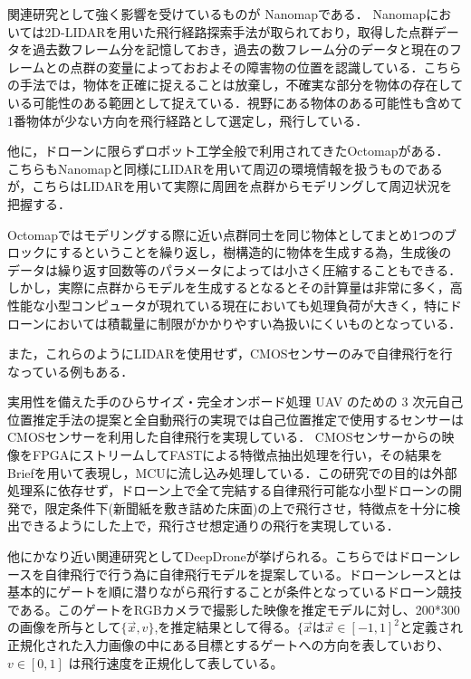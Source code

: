 \documentclass[a4j,10pt]{jsarticle}
\begin{document}
関連研究として強く影響を受けているものが Nanomap\cite{Nanomap}である．
Nanomapにおいては2D-LIDARを用いた飛行経路探索手法が取られており，取得した点群データを過去数フレーム分を記憶しておき，過去の数フレーム分のデータと現在のフレームとの点群の変量によっておおよその障害物の位置を認識している．こちらの手法では，物体を正確に捉えることは放棄し，不確実な部分を物体の存在している可能性のある範囲として捉えている．視野にある物体のある可能性も含めて1番物体が少ない方向を飛行経路として選定し，飛行している．

他に，ドローンに限らずロボット工学全般で利用されてきたOctomap\cite{Octomap}がある．
こちらもNanomapと同様にLIDARを用いて周辺の環境情報を扱うものであるが，こちらはLIDARを用いて実際に周囲を点群からモデリングして周辺状況を把握する．

Octomapではモデリングする際に近い点群同士を同じ物体としてまとめ1つのブロックにするということを繰り返し，樹構造的に物体を生成する為，生成後のデータは繰り返す回数等のパラメータによっては小さく圧縮することもできる．
しかし，実際に点群からモデルを生成するとなるとその計算量は非常に多く，高性能な小型コンピュータが現れている現在においても処理負荷が大きく，特にドローンにおいては積載量に制限がかかりやすい為扱いにくいものとなっている．

また，これらのようにLIDARを使用せず，CMOSセンサーのみで自律飛行を行なっている例もある．

実用性を備えた手のひらサイズ・完全オンボード処理 UAV のための 3 次元自己位置推定手法の提案と全自動飛行の実現\cite{SfMDrone}では自己位置推定で使用するセンサーはCMOSセンサーを利用した自律飛行を実現している．
CMOSセンサーからの映像をFPGAにストリームしてFAST\cite{FAST}による特徴点抽出処理を行い，その結果をBrief\cite{Brief}を用いて表現し，MCUに流し込み処理している．この研究での目的は外部処理系に依存せず，ドローン上で全て完結する自律飛行可能な小型ドローンの開発で，限定条件下(新聞紙を敷き詰めた床面)の上で飛行させ，特徴点を十分に検出できるようにした上で，飛行させ想定通りの飛行を実現している．

他にかなり近い関連研究としてDeepDrone\cite{DeepDrone}が挙げられる。こちらではドローンレースを自律飛行で行う為に自律飛行モデルを提案している。ドローンレースとは基本的にゲートを順に潜りながら飛行することが条件となっているドローン競技である。このゲートをRGBカメラで撮影した映像を推定モデルに対し、200*300の画像を所与として$\lbrace \vec{x}, v \rbrace$,を推定結果として得る。$\lbrace \vec{x}$は$\vec{x} \in [-1,1]^2$と定義され正規化された入力画像の中にある目標とするゲートへの方向を表していおり、 $v \in [0,1]$ は飛行速度を正規化して表している。
\end{document}
